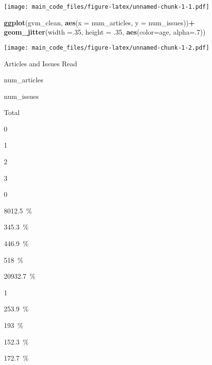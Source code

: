 \documentclass[
]{article}
\newenvironment{Shaded}{\begin{snugshade}}{\end{snugshade}}
\newcommand{\AttributeTok}[1]{\textcolor[rgb]{0.13,0.29,0.53}{#1}}
\newcommand{\ConstantTok}[1]{\textcolor[rgb]{0.56,0.35,0.01}{#1}}
\newcommand{\DecValTok}[1]{\textcolor[rgb]{0.00,0.00,0.81}{#1}}
\newcommand{\FunctionTok}[1]{\textcolor[rgb]{0.13,0.29,0.53}{\textbf{#1}}}
\newcommand{\NormalTok}[1]{#1}
\newcommand{\SpecialCharTok}[1]{\textcolor[rgb]{0.81,0.36,0.00}{\textbf{#1}}}
\newcommand{\StringTok}[1]{\textcolor[rgb]{0.31,0.60,0.02}{#1}}
\begin{document}
\texttt{[image: main\_code\_files/figure-latex/unnamed-chunk-1-1.pdf]}

\begin{Shaded}
\begin{Highlighting}[]
\FunctionTok{ggplot}\NormalTok{(gvm\_clean, }\FunctionTok{aes}\NormalTok{(}\AttributeTok{x =}\NormalTok{ num\_articles, }\AttributeTok{y =}\NormalTok{ num\_issues))}\SpecialCharTok{+}
  \FunctionTok{geom\_jitter}\NormalTok{(}\AttributeTok{width =}\NormalTok{.}\DecValTok{35}\NormalTok{, }\AttributeTok{height =}\NormalTok{ .}\DecValTok{35}\NormalTok{, }\FunctionTok{aes}\NormalTok{(}\AttributeTok{color=}\NormalTok{age, }\AttributeTok{alpha=}\NormalTok{.}\DecValTok{7}\NormalTok{))}
\end{Highlighting}
\end{Shaded}

\texttt{[image: main\_code\_files/figure-latex/unnamed-chunk-1-2.pdf]}

\begin{Shaded}
\end{Shaded}

Articles and Issues Read

num\_articles

num\_issues

Total

0

1

2

3

0

{80}{12.5~\%}

{34}{5.3~\%}

{44}{6.9~\%}

{51}{8~\%}

{209}{32.7~\%}

1

{25}{3.9~\%}

{19}{3~\%}

{15}{2.3~\%}

{17}{2.7~\%}
\end{document}
